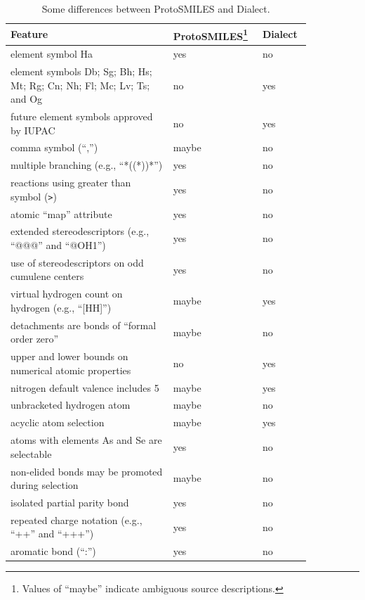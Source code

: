 \documentclass{article}
\def\ttt{\texttt}
\begin{document}
\begin{table}
\begin{minipage}{\textwidth}
\renewcommand*\footnoterule{}
    \caption{Some differences between ProtoSMILES and Dialect.}
    \centering
    \begin{tabular}{p{0.50\linewidth} p{0.20\linewidth} p{0.15\linewidth}}
        \hline
        Feature & ProtoSMILES\footnote{Values of \enquote{maybe} indicate ambiguous source descriptions.} & Dialect \\
        \hline
        element symbol Ha & yes & no \\
        element symbols Db; Sg; Bh; Hs; Mt; Rg; Cn; Nh; Fl; Mc; Lv; Ts; and Og & no & yes \\
        future element symbols approved by IUPAC & no & yes \\
        comma symbol (\enquote{,}) & maybe & no \\
        multiple branching (e.g., \enquote{*((*))*}) & yes & no \\
        reactions using greater than symbol (\ttt{>}) & yes & no \\
        atomic \enquote{map} attribute & yes & no \\
        extended stereodescriptors (e.g., \enquote{@@@} and \enquote{@OH1}) & yes & no \\
        use of stereodescriptors on odd cumulene centers & yes & no \\
        virtual hydrogen count on hydrogen (e.g., \enquote{[HH]}) & maybe & yes \\
        detachments are bonds of \enquote{formal order zero} & maybe & no \\
        upper and lower bounds on numerical atomic properties & no & yes \\
        nitrogen default valence includes 5 & maybe & yes \\
        unbracketed hydrogen atom & maybe & no \\
        acyclic atom selection & maybe & yes \\
        atoms with elements As and Se are selectable & yes & no \\
        non-elided bonds may be promoted during selection & maybe & no \\
        isolated partial parity bond & yes & no \\
        repeated charge notation (e.g., \enquote{++} and \enquote{+++}) & yes & no \\
        aromatic bond (\enquote{:}) & yes & no \\
        \hline
    \end{tabular}
    \label{table:feature-comparison}
\end{minipage}
\end{table}
\end{document}
